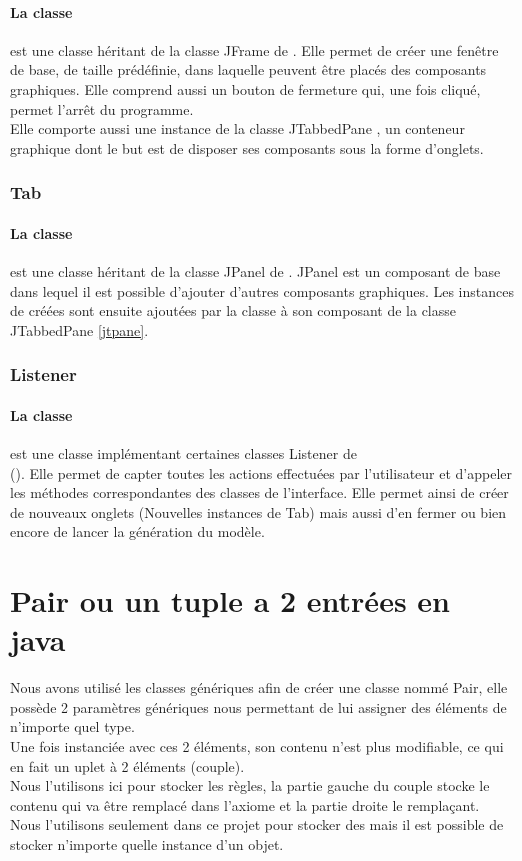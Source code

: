 \paragraph{La classe } est une classe héritant de la classe JFrame de \Swing. Elle permet de créer une fenêtre de base, de taille prédéfinie, dans laquelle peuvent être placés des composants graphiques. Elle comprend aussi un bouton de fermeture qui, une fois cliqué, permet l'arrêt du programme.\\
Elle comporte aussi une instance de la classe JTabbedPane \label{jtpane}, un conteneur graphique dont le but est de disposer ses composants sous la forme d'onglets.

\subsubsection{Tab}

\paragraph{La classe } est une classe héritant de la classe JPanel de \Swing. JPanel est un composant de base dans lequel il est possible d'ajouter d'autres composants graphiques. Les instances de  créées sont ensuite ajoutées par la classe  à son composant de la classe JTabbedPane \ref{jtpane}.

\subsubsection{Listener}

\paragraph{La classe } est une classe implémentant certaines classes Listener de \\\Swing (). Elle permet de capter toutes les actions effectuées par l'utilisateur et d'appeler les méthodes correspondantes des classes de l'interface. Elle permet ainsi de créer de nouveaux onglets (Nouvelles instances de Tab) mais aussi d'en fermer ou bien encore de lancer la génération du modèle.

\section{Pair ou un tuple a 2 entrées en java}

Nous avons utilisé les classes génériques afin de créer une classe nommé Pair, elle possède 2 paramètres génériques nous permettant de lui assigner des éléments de n'importe quel type.\\
Une fois instanciée avec ces 2 éléments, son contenu n'est plus modifiable, ce qui en fait un uplet à 2 éléments (couple).\\
Nous l'utilisons ici pour stocker les règles, la partie gauche du couple stocke le contenu qui va être remplacé dans l'axiome et la partie droite le remplaçant.\\
Nous l'utilisons seulement dans ce projet pour stocker des \string mais il est possible de stocker n'importe quelle instance d'un objet.
